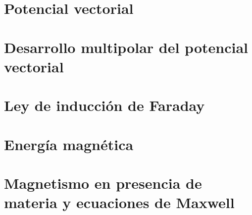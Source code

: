 \documentclass[11pt]{report}
\theoremstyle{plain}
\theoremstyle{definition}
\begin{document}

\chapter{Potencial vectorial}


\chapter{Desarrollo multipolar del potencial vectorial}


\chapter{Ley de inducción de Faraday}


\chapter{Energía magnética}


\chapter{Magnetismo en presencia de materia y ecuaciones de Maxwell}

\end{document}
